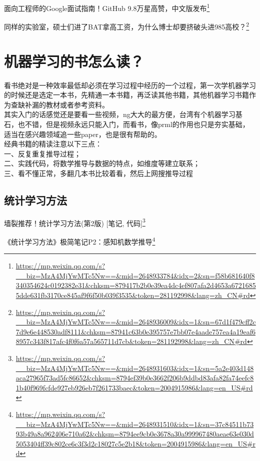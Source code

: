 \documentclass[]{ctexbook}
\renewcommand{\href}[2]{#2\footnote{\url{#1}}}
\begin{document}
\href{https://mp.weixin.qq.com/s?__biz=MzA4MjYwMTc5Nw==\&mid=2648933784\&idx=2\&sn=f58b681640f8340354624c0192382e31\&chksm=879417b2b0e39ea4dc4ef807afa2d4653a67216855dde631fb3170ce845af9f6f50b039f3535\&token=281192998\&lang=zh_CN\#rd}{面向工程师的Google面试指南！GitHub 9.8万星高赞，中文版发布}

\href{https://mp.weixin.qq.com/s?__biz=MzA4MjYwMTc5Nw==\&mid=2648936009\&idx=1\&sn=67d1f479cff2c7d9e6e448530adf8111\&chksm=87941c63b0e395757e7bb07e4aade757ea4a19eaf68957c343f817afc4f0f6a57a565711d7cb\&token=281192998\&lang=zh_CN\#rd}{同样的实验室，硕士们进了BAT拿高工资，为什么博士却要挤破头进985高校？}

\hypertarget{ux673aux5668ux5b66ux4e60ux7684ux4e66ux600eux4e48ux8bfb}{%
\section{机器学习的书怎么读？}\label{ux673aux5668ux5b66ux4e60ux7684ux4e66ux600eux4e48ux8bfb}}

看书绝对是一种效率最低却必须在学习过程中经历的一个过程，第一次学机器学习的时候还是选定一本书，先精通一本书籍，再泛读其他书籍，其他机器学习书籍作为查缺补漏的教材或者参考资料。\\
其实入门的话感觉还是要看一些视频，ng大大的最方便，台湾有个机器学习基石，也不错，但是视频永远只能入门，而看书，像prml的作用也只是夯实基础，适当在感兴趣领域追一些paper，也是很有帮助的。\\
经典书籍的精读注意以下三点：\\
一、反复重复推导过程；\\
二、实践代码，将数学推导与数据的特点，如维度等建立联系；\\
三、看不懂正常，多翻几本书比较着看，然后上网搜推导过程

\hypertarget{ux7edfux8ba1ux5b66ux4e60ux65b9ux6cd5}{%
\subsection{统计学习方法}\label{ux7edfux8ba1ux5b66ux4e60ux65b9ux6cd5}}

\href{https://mp.weixin.qq.com/s?__biz=MzA4MjYwMTc5Nw==\&mid=2648931603\&idx=1\&sn=5a2e403d148aca27965f73ad5fc86652\&chksm=8794ef39b0e3662f206b9ddbd83afa82fa74eefc81b40f969fcfde927eb926eb7f261733baec\&token=2004915986\&lang=en_US\#rd}{墙裂推荐！统计学习方法(第2版) {[}笔记, 代码{]}}

\href{https://mp.weixin.qq.com/s?__biz=MzA4MjYwMTc5Nw==\&mid=2648931510\&idx=1\&sn=37c84511b7393b49a8a962406e710a62\&chksm=8794ee9cb0e3678a30a999967480aeae63e030d5053404ff39c802ce6c3f3d2c18027c5e2b18\&token=2004915986\&lang=en_US\#rd}{《统计学习方法》极简笔记P2：感知机数学推导}
\end{document}
